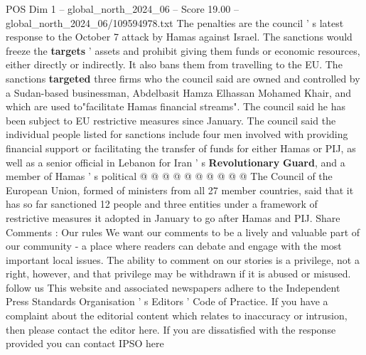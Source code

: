 \begin{textsample}{POS Dim 1 – global\_north\_2024\_06 – Score 19.00 – global\_north\_2024\_06/109594978.txt}
The penalties are the council ' s latest response to the October 7 attack by Hamas against Israel.
The sanctions would freeze the \textbf{targets} ' assets and prohibit giving them funds or economic resources, either directly or indirectly.
It also bans them from travelling to the EU.
The sanctions \textbf{targeted} three firms who the council said are owned and controlled by a Sudan-based businessman, Abdelbasit Hamza Elhassan Mohamed Khair, and which are used to"facilitate Hamas financial streams".
The council said he has been subject to EU restrictive measures since January.
The council said the individual people listed for sanctions include four men involved with providing financial support or facilitating the transfer of funds for either Hamas or PIJ, as well as a senior official in Lebanon for Iran ' s \textbf{Revolutionary} \textbf{Guard}, and a member of Hamas ' s political @ @ @ @ @ @ @ @ @ @ The Council of the European Union, formed of ministers from all 27 member countries, said that it has so far sanctioned 12 people and three entities under a framework of restrictive measures it adopted in January to go after Hamas and PIJ.
Share Comments : Our rules We want our comments to be a lively and valuable part of our community - a place where readers can debate and engage with the most important local issues.
The ability to comment on our stories is a privilege, not a right, however, and that privilege may be withdrawn if it is abused or misused. follow us This website and associated newspapers adhere to the Independent Press Standards Organisation ' s Editors ' Code of Practice.
If you have a complaint about the editorial content which relates to inaccuracy or intrusion, then please contact the editor here.
If you are dissatisfied with the response provided you can contact IPSO here

\end{textsample}
